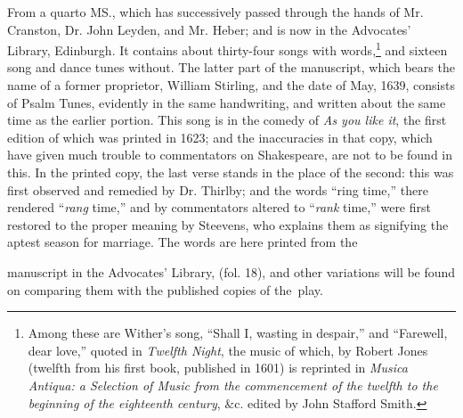 \vspace{-\baselineskip}



\vspace{-2\baselineskip}


From a quarto MS., which has successively passed through the hands of
Mr. Cranston, Dr. John Leyden, and Mr. Heber; and is now in the Advocates’
Library, Edinburgh. It contains about thirty-four songs with words,\footnote{\textit{}
Among these are Wither’s song, “Shall I, wasting
in despair,” and “Farewell, dear love,” quoted in \textit{Twelfth
Night}, the music of which, by Robert Jones (twelfth from
his first book, published in 1601) is reprinted in \textit{Musica
Antiqua: a Selection of Music from the commencement of
the twelfth to the beginning of the eighteenth century}, \&c.
edited by John Stafford Smith.}
 and sixteen
song and dance tunes without. The latter part of the manuscript, which bears
the name of a former proprietor, William Stirling, and the date of May, 1639,
consists of Psalm Tunes, evidently in the same handwriting, and written about
the same time as the earlier portion. This song is in the comedy of \textit{As you
like it}, the first edition of which was printed in 1623; and the inaccuracies in
that copy, which have given much trouble to commentators on Shakespeare, are
not to be found in this. In the printed copy, the last verse stands in the place of
the second: this was first observed and remedied by Dr. Thirlby; and the words
“ring time,” there rendered “\textit{rang} time,” and by commentators altered to “\textit{rank}
time,” were first restored to the proper meaning by Steevens, who explains them
as signifying the aptest season for marriage. \pagebreak The words are here printed from the
manuscript in the Advocates’ Library, (fol. 18), and other variations will be
found on comparing them with the published copies of the~play.



\vspace{-2\baselineskip}

